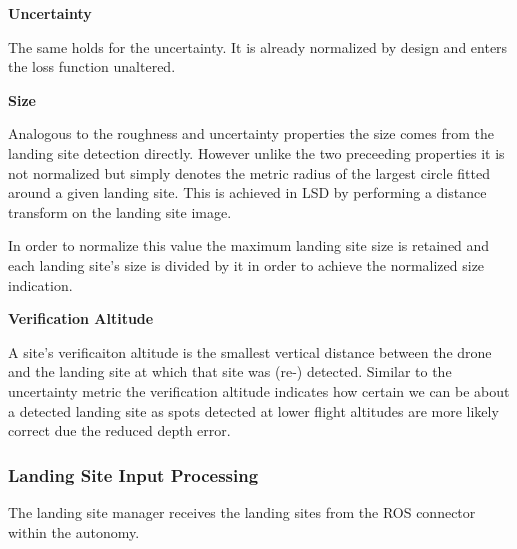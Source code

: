 \textbf{Uncertainty}

The same holds for the uncertainty. It is already normalized by design and enters the loss function unaltered.

\textbf{Size}

Analogous to the roughness and uncertainty properties the size comes from the landing site detection directly. However unlike the two preceeding properties it is not normalized but simply denotes the metric radius of the largest circle fitted around a given landing site. This is achieved in LSD by performing a distance transform on the landing site image.

In order to normalize this value the maximum landing site size is retained and each landing site's size is divided by it in order to achieve the normalized size indication.

\textbf{Verification Altitude}

A site's verificaiton altitude is the smallest vertical distance between the drone and the landing site at which that site was (re-) detected. Similar to the uncertainty metric the verification altitude indicates how certain we can be about a detected landing site as spots detected at lower flight altitudes are more likely correct due the reduced depth error. 

\subsubsection{Landing Site Input Processing}
The landing site manager receives the landing sites from the ROS connector within the autonomy. 

\subsubsection{}

